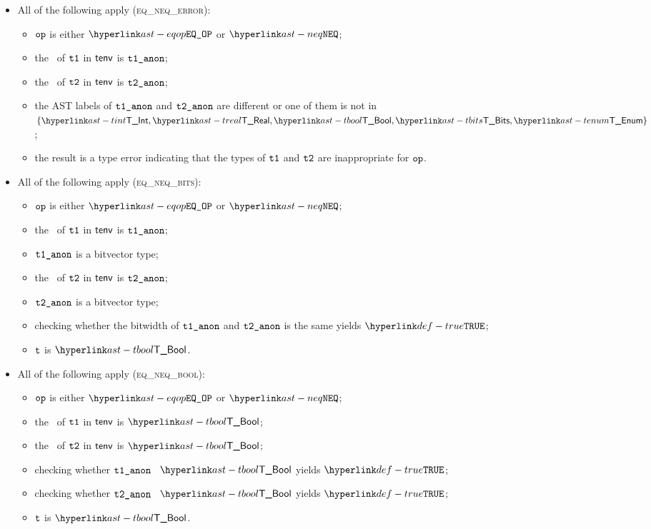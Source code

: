 \begin{itemize}
  \item All of the following apply (\textsc{eq\_neq\_error}):
  \begin{itemize}
    \item $\texttt{op}$ is either $\EQOP$ or $\NEQ$;
    \item the \underlyingtype\ of $\texttt{t1}$ in $\textsf{tenv}$ is $\texttt{t1\_anon}$\ProseOrTypeError;
    \item the \underlyingtype\ of $\texttt{t2}$ in $\textsf{tenv}$ is $\texttt{t2\_anon}$\ProseOrTypeError;
    \item the AST labels of $\texttt{t1\_anon}$ and $\texttt{t2\_anon}$ are different or one of them is not in
          $\{\TInt, \TReal, \TBool, \TBits, \TEnum\}$;
    \item the result is a type error indicating that the types of $\texttt{t1}$ and $\texttt{t2}$ are inappropriate for $\texttt{op}$.
  \end{itemize}

  \item All of the following apply (\textsc{eq\_neq\_bits}):
  \begin{itemize}
    \item $\texttt{op}$ is either $\EQOP$ or $\NEQ$;
    \item the \underlyingtype\ of $\texttt{t1}$ in $\textsf{tenv}$ is $\texttt{t1\_anon}$\ProseOrTypeError;
    \item $\texttt{t1\_anon}$ is a bitvector type;
    \item the \underlyingtype\ of $\texttt{t2}$ in $\textsf{tenv}$ is $\texttt{t2\_anon}$\ProseOrTypeError;
    \item $\texttt{t2\_anon}$ is a bitvector type;
    \item checking whether the bitwidth of $\texttt{t1\_anon}$ and $\texttt{t2\_anon}$ is the same yields $\True$\ProseOrTypeError;
    \item $\texttt{t}$ is $\TBool$.
  \end{itemize}

  \item All of the following apply (\textsc{eq\_neq\_bool}):
  \begin{itemize}
    \item $\texttt{op}$ is either $\EQOP$ or $\NEQ$;
    \item the \underlyingtype\ of $\texttt{t1}$ in $\textsf{tenv}$ is $\TBool$\ProseOrTypeError;
    \item the \underlyingtype\ of $\texttt{t2}$ in $\textsf{tenv}$ is $\TBool$\ProseOrTypeError;
    \item checking whether $\texttt{t1\_anon}$ \typesatisfies\ $\TBool$ yields $\True$\ProseOrTypeError;
    \item checking whether $\texttt{t2\_anon}$ \typesatisfies\ $\TBool$ yields $\True$\ProseOrTypeError;
    \item $\texttt{t}$ is $\TBool$.
  \end{itemize}


\end{itemize}
